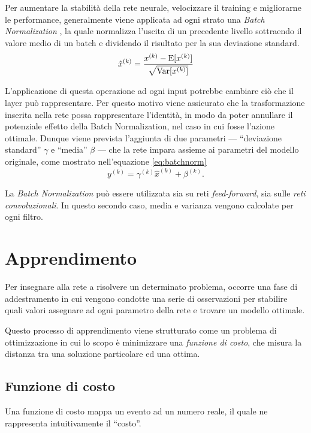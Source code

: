 Per aumentare la stabilità della rete neurale, velocizzare il training e migliorarne le performance, generalmente viene applicata ad ogni strato una \emph{Batch Normalization}  \cite{ioffe2015batch}, la quale normalizza l'uscita di un precedente livello sottraendo il valore medio di un batch e dividendo il risultato per la sua deviazione standard.
\begin{equation}
	\hat{x}^{(k)}=\frac{x^{(k)}-\operatorname{E}[x^{(k)}]}{\sqrt{\operatorname{Var}[x^{(k)}]}}
\end{equation}

L'applicazione di questa operazione ad ogni input potrebbe cambiare ciò che il layer può rappresentare. Per questo motivo viene assicurato che la trasformazione inserita nella rete possa rappresentare l'identità, in modo da poter annullare il potenziale effetto della Batch Normalization, nel caso in cui fosse l'azione ottimale.
Dunque viene prevista l'aggiunta di due parametri --- ``deviazione standard'' $\gamma$ e ``media'' $\beta$ --- che la rete impara assieme ai parametri del modello originale, come mostrato nell'equazione \ref{eq:batchnorm}
\begin{equation}
	y^{(k)}=\gamma^{(k)}\hat{x}^{(k)}+\beta^{(k)}\mbox{.}
	\label{eq:batchnorm}
\end{equation}

La \emph{Batch Normalization} può essere utilizzata sia su reti \emph{feed-forward}, sia sulle \emph{reti convoluzionali}.
In questo secondo caso, media e varianza vengono calcolate per ogni filtro.

\section{Apprendimento}
\label{sec:apprendimento}
Per insegnare alla rete a risolvere un determinato problema, occorre una fase di addestramento in cui vengono condotte una serie di osservazioni per stabilire quali valori assegnare ad ogni parametro della rete e trovare un modello ottimale.

Questo processo di apprendimento viene strutturato come un problema di ottimizzazione in cui lo scopo è minimizzare una \emph{funzione di costo}, che misura la distanza tra una soluzione particolare ed una ottima. 

\subsection{Funzione di costo}
\label{subsec:loss}

Una funzione di costo mappa un evento ad un numero reale, il quale ne rappresenta intuitivamente il ``costo''.

